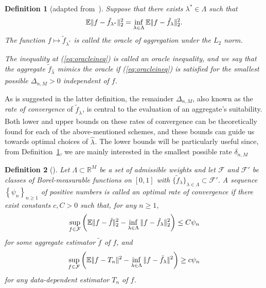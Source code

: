 \documentclass[11pt, letter paper]{article}
\newcommand{\1}{\mathmybb{1}}
\newtheorem{definition}{Definition}[section]
\newcommand{\R}{\mathbb{R}}
\newcommand{\0}{\emptyset}
\newcommand{\E}{\mathbb{E}}
\newcommand{\paren}[1]{\left(#1 \right)}
\newcommand{\set}[1]{\left\{ #1 \right\}}
\newcommand{\norm}[1]{|\hspace{-1pt}|#1 |\hspace{-1pt}|}
\newcommand{\normsq}[1]{\norm{#1}^{2}}
\newcommand{\Fcal}{\mathcal{F}}
\newcommand{\ftilde}[1]{\tilde{f}_{#1}}
\newcommand{\lambdahat}[1]{\hat{\lambda}_{#1}}
\begin{document}
\begin{definition}[adapted from~\cite{tsybakov_introduction_2009}]\label{def:oracle}
    Suppose that there exists \(\lambda^{*}\in\Lambda\) such that 
    \[\E\normsq{f-\ftilde{\lambda^{*}}}_{2} = \inf_{\lambda\in\Lambda}\E\normsq{f-\ftilde{\lambda}}_{2}.\]
    The function \(f\mapsto \ftilde{\lambda^{*}}\) is called the oracle of aggregation under the \(L_{2}\) norm.

    The inequality at (\ref{eq:oracleineq}) is called an oracle inequality, and we say that the aggregate \(\ftilde{\lambdahat{}}\) {mimics} the oracle if (\ref{eq:oracleineq}) is satisfied for the smallest possible \(\Delta_{n,M}>0\) independent of \(f\).
\end{definition}

As is suggested in the latter definition, the remainder \(\Delta_{n,M}\), also known as the \emph{rate of convergence} of \(\ftilde{\lambdahat{}}\), is central to the evaluation of an aggregate's suitability. Both lower and upper bounds on these rates of convergence can be theoretically found for each of the above-mentioned schemes, and these bounds can guide us towards optimal choices of \(\lambdahat{}\). The lower bounds will be particularly useful since, from Definition~\ref{def:oracle}, we are mainly interested in the smallest possible rate \(\delta_{n,M}\)

\begin{definition}[\cite{tsybakov_introduction_2009}]
    Let \(\Lambda\subset\R^{M}\) be a set of admissible weights and let \(\Fcal\) and \(\Fcal'\) be classes of Borel-measurable functions on \([0,1]\) with \({\{\ftilde{\lambda}\}}_{\lambda\in\Lambda}\subset\Fcal'\). A sequence \(\set{\psi_{n}}_{n\geq1}\) of positive numbers is called an optimal rate of convergence if there exist constants \(c, C>0\) such that, for any \(n\geq 1\), 
    \begin{equation}\label{eq:orcupper}
        \sup_{f\in\Fcal}\paren{\E\normsq{f-\ftilde{}}_{2} - \inf_{\lambda\in\Lambda}\normsq{f - \ftilde{\lambda}}_{2}}\leq C\psi_{n}
    \end{equation}
    for some aggregate estimator \(\ftilde{}\) of \(f\), and 
    \begin{equation}\label{eq:orclower}
        \sup_{f\in\Fcal}\paren{\E\normsq{f - T_{n}} - \inf_{\lambda\in\Lambda}\normsq{f - \ftilde{\lambda}}}\geq c\psi_{n}     
    \end{equation}
    for any data-dependent estimator \(T_{n}\) of \(f\).
\end{definition}
\end{document}
